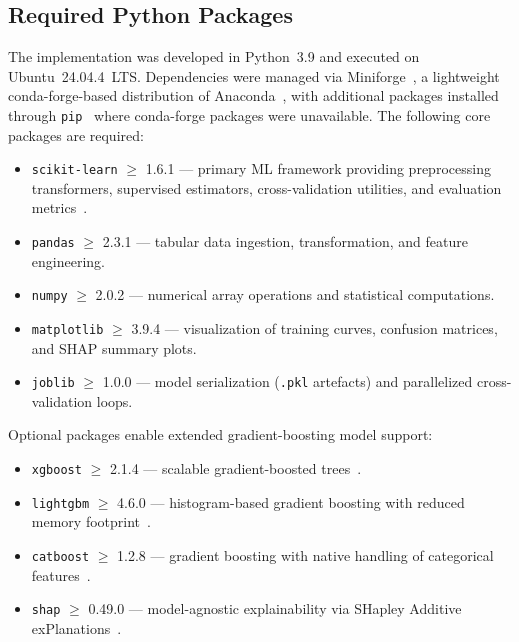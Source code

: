 \documentclass[diagnostics,article,submit,pdftex,moreauthors]{Definitions/mdpi}
\begin{document}
\subsection[\appendixname~\thesubsection]{Required Python Packages}
The implementation was developed in Python~3.9 and executed on Ubuntu~24.04.4~LTS.
Dependencies were managed via Miniforge~\cite{miniforge2021}, a lightweight
conda-forge-based distribution of Anaconda~\cite{anaconda2020package}, with additional
packages installed through \texttt{pip}~\cite{pip_pypa} where conda-forge
packages were unavailable. The following core packages are required:
\begin{itemize}
    \item \texttt{scikit-learn} $\ge$ 1.6.1 — primary \ac{ML} framework providing preprocessing transformers, supervised estimators, cross-validation utilities, and evaluation metrics~\cite{sklearn-api}.
    \item \texttt{pandas} $\ge$ 2.3.1 — tabular data ingestion, transformation, and feature engineering.
    \item \texttt{numpy} $\ge$ 2.0.2 — numerical array operations and statistical computations.
    \item \texttt{matplotlib} $\ge$ 3.9.4 — visualization of training curves, confusion matrices, and \ac{SHAP} summary plots.
    \item \texttt{joblib} $\ge$ 1.0.0 — model serialization (\texttt{.pkl} artefacts) and parallelized cross-validation loops.
\end{itemize}
Optional packages enable extended gradient-boosting model support:
\begin{itemize}
    \item \texttt{xgboost} $\ge$ 2.1.4 — scalable gradient-boosted trees~\cite{chen2016xgboost}.
    \item \texttt{lightgbm} $\ge$ 4.6.0 — histogram-based gradient boosting with reduced memory footprint~\cite{ke2017lightgbm}.
    \item \texttt{catboost} $\ge$ 1.2.8 — gradient boosting with native handling of categorical features~\cite{prokhorenkova2018catboost}.
    \item \texttt{shap} $\ge$ 0.49.0 — model-agnostic explainability via SHapley Additive exPlanations~\cite{lundberg2017shap}.
\end{itemize}


\end{document}
